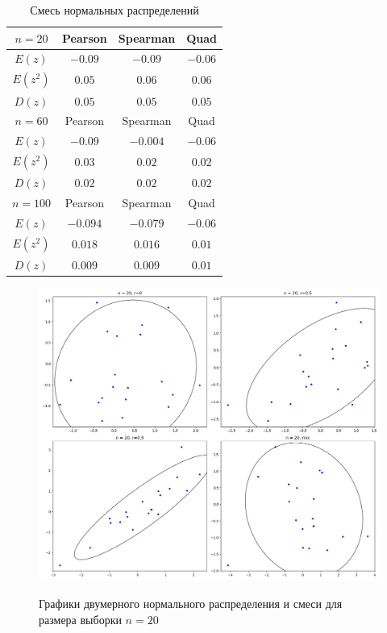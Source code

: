 \documentclass[a4]{article}
\begin{document}
\begin{table}[H]
	\caption{Смесь нормальных распределений}
	\label{tab:my_label3}
	\begin{center}
		\vspace{5mm}
		\begin{tabular}{|c|c|c|c|}
			\hline
			$ n=20 $ & Pearson & Spearman & Quad\\
			\hline
			$ E(z) $ & $ -0.09 $ & $ -0.09 $ & $ -0.06 $\\
			\hline
			$ E(z^{2}) $ & $ 0.05 $ & $ 0.06 $ & $ 0.06 $\\
			\hline
			$ D(z) $  & $ 0.05 $ & $ 0.05 $ & $ 0.05 $\\
			\hline
			$ n=60 $ & Pearson & Spearman & Quad\\
			\hline
			$ E(z) $ & $ -0.09 $ & $ -0.004 $ & $ -0.06 $\\
			\hline
			$ E(z^{2}) $ & $ 0.03 $ & $ 0.02 $ & $ 0.02 $\\
			\hline
			$ D(z) $  & $ 0.02 $ & $ 0.02 $ & $ 0.02 $ \\
			\hline
			$ n=100 $ & Pearson & Spearman & Quad\\
			\hline       
			$ E(z) $ & $ -0.094 $ & $ -0.079 $ & $ -0.06 $\\
			\hline
			$ E(z^{2}) $ & $ 0.018 $ & $ 0.016 $ & $ 0.01 $\\
			\hline
			$ D(z) $  & $ 0.009 $ & $ 0.009 $ & $ 0.01 $ \\
			\hline
		\end{tabular}
	\end{center}
\end{table}

\begin{figure}[H]
	\centering
	\caption{Графики двумерного нормального распределения и смеси для размера выборки $ n =20 $ }
	\includegraphics[scale = 0.5]{ellipse_n=20.png} 
	\label{fig:dis_norm_gis0}
\end{figure}
\end{document}
